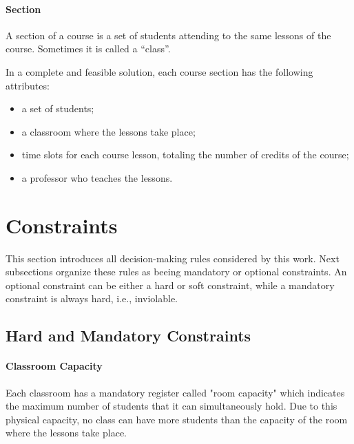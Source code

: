 \paragraph{Section}
\label{defsection}

A section of a course is a set of students attending to the same lessons of the course. Sometimes it is called a ``class''.

In a complete and feasible solution, each course section has the following attributes:
\begin{itemize}
\item a set of students;
\item a classroom where the lessons take place;
\item time slots for each course lesson, totaling the number of credits of the course;
\item a professor who teaches the lessons.
\end{itemize}





\pagebreak

\section{Constraints}
\label{sec:allconstr}

This section introduces all decision-making rules considered by this work. Next subsections organize these rules as beeing mandatory or optional constraints. An optional constraint can be either a hard or soft constraint, while a mandatory constraint is always hard, i.e., inviolable.


\subsection{Hard and Mandatory Constraints}
\label{sec:mandatory}


\paragraph{Classroom Capacity}
\label{constrroomcap}

Each classroom has a mandatory register called "room capacity" which indicates the maximum number of students that it can simultaneously hold. Due to this physical capacity, no class can have more students than the capacity of the room where the lessons take place.


